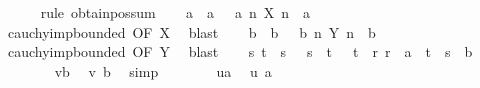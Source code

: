 \begin{isabellebody}
\ \ \ \ \isamarkupfalse%
\ {\isacharparenleft}{\kern0pt}rule\ obtain{\isacharunderscore}{\kern0pt}pos{\isacharunderscore}{\kern0pt}sum{\isacharparenright}{\kern0pt}\isanewline
\ \ \isamarkupfalse%
\ a\ \ a{\isacharcolon}{\kern0pt}\ {\isachardoublequoteopen}{}\ {\isacharless}{\kern0pt}\ a{\isachardoublequoteclose}\ {\isachardoublequoteopen}{\isasymforall}n{\isachardot}{\kern0pt}\ {\isasymbar}X\ n{\isasymbar}\ {\isacharless}{\kern0pt}\ a{\isachardoublequoteclose}\isanewline
\ \ \ \ \isamarkupfalse%
\ cauchy{\isacharunderscore}{\kern0pt}imp{\isacharunderscore}{\kern0pt}bounded\ {\isacharbrackleft}{\kern0pt}OF\ X{\isacharbrackright}{\kern0pt}\ \isamarkupfalse%
\ blast\isanewline
\ \ \isamarkupfalse%
\ b\ \ b{\isacharcolon}{\kern0pt}\ {\isachardoublequoteopen}{}\ {\isacharless}{\kern0pt}\ b{\isachardoublequoteclose}\ {\isachardoublequoteopen}{\isasymforall}n{\isachardot}{\kern0pt}\ {\isasymbar}Y\ n{\isasymbar}\ {\isacharless}{\kern0pt}\ b{\isachardoublequoteclose}\isanewline
\ \ \ \ \isamarkupfalse%
\ cauchy{\isacharunderscore}{\kern0pt}imp{\isacharunderscore}{\kern0pt}bounded\ {\isacharbrackleft}{\kern0pt}OF\ Y{\isacharbrackright}{\kern0pt}\ \isamarkupfalse%
\ blast\isanewline
\ \ \isamarkupfalse%
\ s\ t\ \ s{\isacharcolon}{\kern0pt}\ {\isachardoublequoteopen}{}\ {\isacharless}{\kern0pt}\ s{\isachardoublequoteclose}\ \ t{\isacharcolon}{\kern0pt}\ {\isachardoublequoteopen}{}\ {\isacharless}{\kern0pt}\ t{\isachardoublequoteclose}\ \ r{\isacharcolon}{\kern0pt}\ {\isachardoublequoteopen}r\ {\isacharequal}{\kern0pt}\ a\ {\isacharasterisk}{\kern0pt}\ t\ {\isacharplus}{\kern0pt}\ s\ {\isacharasterisk}{\kern0pt}\ b{\isachardoublequoteclose}\isanewline
\ \ \isamarkupfalse%
\isanewline
\ \ \ \ \isamarkupfalse%
\ {\isachardoublequoteopen}{}\ {\isacharless}{\kern0pt}\ v{\isacharslash}{\kern0pt}b{\isachardoublequoteclose}\ \isamarkupfalse%
\ v\ b{\isacharparenleft}{\kern0pt}{}{\isacharparenright}{\kern0pt}\ \isamarkupfalse%
\ simp\isanewline
\ \ \ \ \isamarkupfalse%
\ {\isachardoublequoteopen}{}\ {\isacharless}{\kern0pt}\ u{\isacharslash}{\kern0pt}a{\isachardoublequoteclose}\ \isamarkupfalse%
\ u\ a{\isacharparenleft}{\kern0pt}{}{\isacharparenright}{\kern0pt}\ \isamarkupfalse%

\end{isabellebody}
